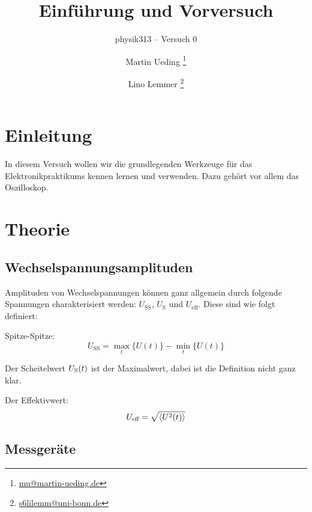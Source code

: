 


\usepackage{cleveref}



\subject{Praktikumsprotokoll}
\title{Einführung und Vorversuch}
\subtitle{physik313 – Versuch 0}
\author{
	Martin Ueding \footnote{\href{mailto:mu@martin-ueding.de}{mu@martin-ueding.de}}
	\and
	Lino Lemmer \footnote{\href{mailto:s6lilemm@uni-bonn.de}{s6lilemm@uni-bonn.de}}
}



\maketitle

\tableofcontents
\newpage

\section{Einleitung}

In diesem Versuch wollen wir die grundlegenden Werkzeuge für das
Elektronikpraktikums kennen lernen und verwenden. Dazu gehört vor allem das
Oszilloskop.

\section{Theorie}

\subsection{Wechselspannungsamplituden}

Amplituden von Wechselspannungen können ganz allgemein durch folgende Spannungen charakterisiert werden: $U_\text{SS}$, $U_\text{S}$ und $U_\text{eff}$. Diese sind wie folgt definiert:

Spitze-Spitze:
\[
	U_\text{SS} = \max_t \{ U(t) \} - \min_t \{ U(t) \}
\]

Der Scheitelwert $U_\text S(t)$ ist der Maximalwert, dabei ist die Definition nicht ganz klar.

Der Effektivwert:
\[
	U_\text{eff} = \sqrt{\braket{U^2(t)}}
\]

\subsection{Messgeräte}

